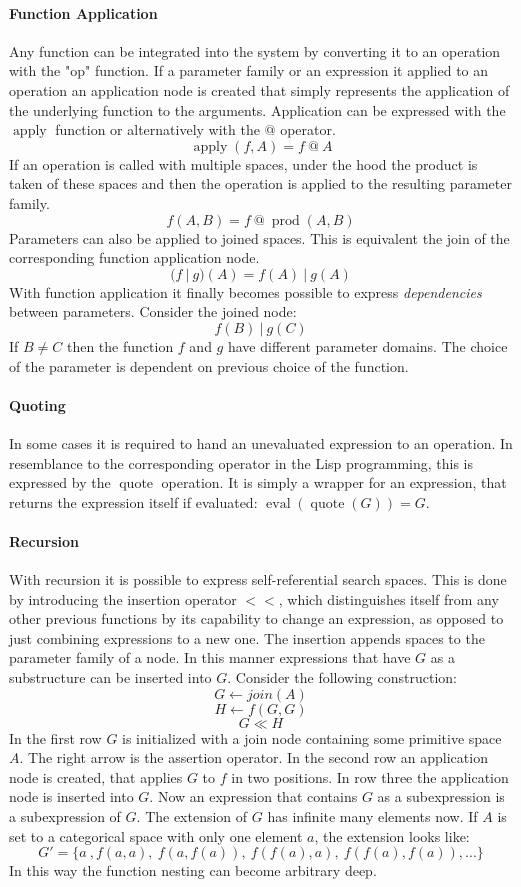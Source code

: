 \documentclass[english]{article}
\newcommand{\apply}{\operatorname{apply}}
\newcommand{\eval}{\operatorname{eval}}
\newcommand{\prot}{\operatorname{prod}}
\newcommand{\quot}{\operatorname{quote}}
\begin{document}
\paragraph{Function Application}
Any function can be integrated into the system by converting it to an operation with the "op" function. If a parameter family or an expression it applied to an operation an application node is created that simply represents the application of the underlying function to the arguments. Application can be expressed with the $\apply$ function or alternatively with the $@$ operator.
$$\apply(f, A) = f\ @\ A$$
If an operation is called with multiple spaces, under the hood the product is taken of these spaces and then the operation is applied to the resulting parameter family.
$$f(A,B) = f\ @\ \prot(A,B)$$
Parameters can also be applied to joined spaces. This is equivalent the join of the corresponding function application node.
$$(f\ |\ g)(A) = f(A)\ |\ g(A)$$
With function application it finally becomes possible to express \textit{dependencies} between parameters. Consider the joined node:
$$f(B)\ |\ g(C)$$
If $B \neq C$ then the function $f$ and $g$ have different parameter domains. The choice of the parameter is dependent on previous choice of the function.

\paragraph{Quoting}
In some cases it is required to hand an unevaluated expression to an operation. In resemblance to the corresponding operator in the Lisp programming, this is expressed by the $\operatorname{quote}$ operation. It is simply a wrapper for an expression, that returns the expression itself if evaluated: $\eval(\quot(G)) = G$.

\paragraph{Recursion}
With recursion it is possible to express self-referential search spaces. This is done by introducing the insertion operator $<<$, which distinguishes itself from any other previous functions by its capability to change an expression, as opposed to just combining expressions to a new one. The insertion appends spaces to the parameter family of a node. In this manner expressions that have $G$ as a substructure can be inserted into $G$. Consider the following construction:
$$G \leftarrow join(A)$$
$$H \leftarrow f(G, G)$$
$$ G  \ll H$$
In the first row $G$ is initialized with a join node containing some primitive space $A$. The right arrow is the assertion operator. In the second row an application node is created, that applies $G$ to $f$ in two positions. In row three the application node is inserted into $G$. Now an expression that contains $G$ as a subexpression is a subexpression of $G$.
The extension of $G$ has infinite many elements now. If $A$ is set to a categorical space with only one element $a$, the extension looks like:
$$ G' = \{a\ ,f(a,a),\ f(a,f(a)),\ f(f(a),a),\ f(f(a),f(a)), ...\}$$
In this way the function nesting can become arbitrary deep.
\end{document}
